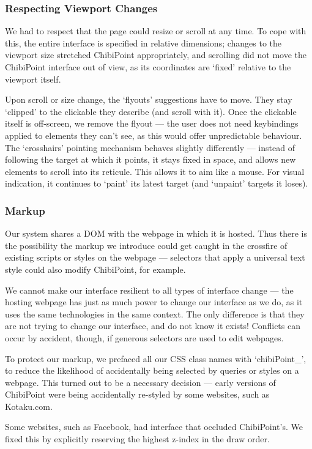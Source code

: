 \documentclass[11pt,openright,a4paper]{report}
\begin{document}
\subsubsection{Respecting Viewport Changes}
We had to respect that the page could resize or scroll at any time. To cope with this, the entire interface is specified in relative dimensions; changes to the viewport size stretched ChibiPoint appropriately, and scrolling did not move the ChibiPoint interface out of view, as its coordinates are `fixed' relative to the viewport itself.

Upon scroll or size change, the `flyouts' suggestions have to move. They stay `clipped' to the clickable they describe (and scroll with it). Once the clickable itself is off-screen, we remove the flyout --- the user does not need keybindings applied to elements they can't see, as this would offer unpredictable behaviour. The `crosshairs' pointing mechanism behaves slightly differently --- instead of following the target at which it points, it stays fixed in space, and allows new elements to scroll into its reticule. This allows it to aim like a mouse. For visual indication, it continues to `paint' its latest target (and `unpaint' targets it loses).

\subsubsection{Markup}
Our system shares a DOM with the webpage in which it is hosted. Thus there is the possibility the markup we introduce could get caught in the crossfire of existing scripts or styles on the webpage --- selectors that apply a universal text style could also modify ChibiPoint, for example.

We cannot make our interface resilient to all types of interface change --- the hosting webpage has just as much power to change our interface as we do, as it uses the same technologies in the same context. The only difference is that they are not trying to change our interface, and do not know it exists! Conflicts can occur by accident, though, if generous selectors are used to edit webpages.

To protect our markup, we prefaced all our CSS class names with `chibiPoint\_', to reduce the likelihood of accidentally being selected by queries or styles on a webpage. This turned out to be a necessary decision --- early versions of ChibiPoint were being accidentally re-styled by some websites, such as Kotaku.com.

Some websites, such as Facebook, had interface that occluded ChibiPoint's. We fixed this by explicitly reserving the highest z-index in the draw order.
\end{document}
